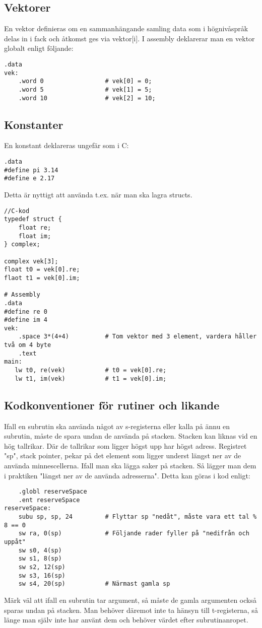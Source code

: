 \documentclass[a4paper]{article}
\begin{document}
\subsection{Vektorer}
En vektor definieras om en sammanhängande samling data som i högnivåspråk delas in i fack och åtkomst ges via vektor$[$i$]$. I assembly deklarerar man en vektor globalt enligt följande:
\begin{verbatim}
.data
vek:
    .word 0                 # vek[0] = 0;
    .word 5                 # vek[1] = 5;
    .word 10                # vek[2] = 10;
\end{verbatim}
\subsection{Konstanter}
En konstant deklareras ungefär som i C:
\begin{verbatim}
.data
#define pi 3.14
#define e 2.17
\end{verbatim}
Detta är nyttigt att använda t.ex. när man ska lagra structs.
\begin{verbatim}
//C-kod
typedef struct {
    float re;
    float im;
} complex;

complex vek[3];
float t0 = vek[0].re;
flaot t1 = vek[0].im;

# Assembly
.data
#define re 0
#define im 4
vek:
    .space 3*(4+4)          # Tom vektor med 3 element, vardera håller två om 4 byte
    .text
main:
   lw t0, re(vek)           # t0 = vek[0].re;
   lw t1, im(vek)           # t1 = vek[0].im;
\end{verbatim}

\subsection{Kodkonventioner för rutiner och likande}
Ifall en subrutin ska använda något av s-registerna eller kalla på ännu en subrutin, måste de spara undan de använda på stacken. Stacken kan liknas vid en hög tallrikar. Där de tallrikar som ligger högst upp har högst adress. Registret "sp", stack pointer, pekar på det element som ligger underst längst ner av de använda minnescellerna. Ifall man ska lägga saker på stacken. Så lägger man dem i praktiken "längst ner av de använda adresserna". Detta kan göras i kod enligt:
\begin{verbatim}
    .globl reserveSpace
    .ent reserveSpace
reserveSpace:
    subu sp, sp, 24         # Flyttar sp "nedåt", måste vara ett tal % 8 == 0
    sw ra, 0(sp)            # Följande rader fyller på "nedifrån och uppåt"
    sw s0, 4(sp)
    sw s1, 8(sp)
    sw s2, 12(sp)
    sw s3, 16(sp)
    sw s4, 20(sp)           # Närmast gamla sp
\end{verbatim}
Märk väl att ifall en subrutin tar argument, så måste de gamla argumenten också sparas undan på stacken. Man behöver däremot inte ta hänsyn till t-registerna, så länge man själv inte har använt dem och behöver värdet efter subrutinanropet.
\end{document}
